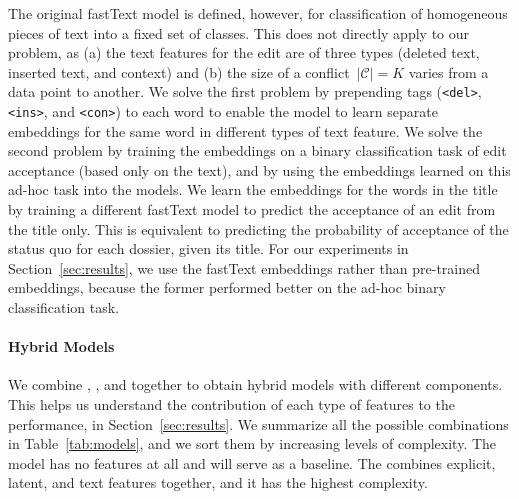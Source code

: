 The original fastText model is defined, however, for classification of homogeneous pieces of text into a fixed set of classes.
This does not directly apply to our problem, as (a) the text features for the edit are of three types (deleted text, inserted text, and context) and (b) the size of a conflict~$\vert \mathcal{C} \vert = K$ varies from a data point to another.
We solve the first problem by prepending tags (\texttt{<del>}, \texttt{<ins>}, and \texttt{<con>}) to each word to enable the model to learn separate embeddings for the same word in different types of text feature.
We solve the second problem by training the embeddings on a binary classification task of edit acceptance (based only on the text), and by using the embeddings learned on this ad-hoc task into the \wow{} models.
We learn the embeddings for the words in the title by training a different fastText model to predict the acceptance of an edit from the title only.
This is equivalent to predicting the probability of acceptance of the status quo for each dossier, given its title.
For our experiments in Section~\ref{sec:results}, we use the fastText embeddings rather than pre-trained embeddings, because the former performed better on the ad-hoc binary classification task.

\paragraph{Hybrid Models}

We combine , , and  together to obtain hybrid models with different components.
This helps us understand the contribution of each type of features to the performance, in Section~\ref{sec:results}.
We summarize all the possible combinations in Table~\ref{tab:models}, and we sort them by increasing levels of complexity.
The \wow{} model has no features at all and will serve as a baseline.
The  combines explicit, latent, and text features together, and it has the highest complexity.

